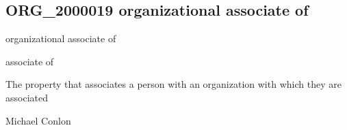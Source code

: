 \documentclass[letterpaper,10pt,english]{sphinxmanual}
\begin{document}
\subsection{ORG\_2000019 \sphinxhyphen{} organizational associate of}
\label{\detokenize{doc-ORG_2000019:org-2000019-organizational-associate-of}}\label{\detokenize{doc-ORG_2000019:index-0}}\label{\detokenize{doc-ORG_2000019::doc}}
\begin{sphinxShadowBox}

\sphinxAtStartPar
organizational associate of
\end{sphinxShadowBox}

\begin{sphinxShadowBox}

\sphinxAtStartPar
associate of
\end{sphinxShadowBox}

\begin{sphinxShadowBox}

\sphinxAtStartPar
{}
\end{sphinxShadowBox}

\begin{sphinxShadowBox}

\sphinxAtStartPar
The property that associates a person with an organization with which they are associated
\end{sphinxShadowBox}

\begin{sphinxShadowBox}

\sphinxAtStartPar
Michael Conlon 
\end{sphinxShadowBox}

\begin{sphinxShadowBox}

\sphinxAtStartPar
{\hyperref[\detokenize{doc-NCBITaxon_9606::doc}]{}}
\end{sphinxShadowBox}

\begin{sphinxShadowBox}

\sphinxAtStartPar
{\hyperref[\detokenize{doc-ORG_0000001::doc}]{}}
\end{sphinxShadowBox}
\end{document}
